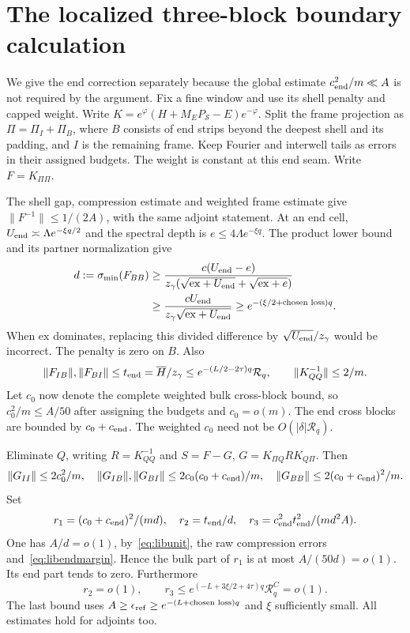 \section{The localized three-block boundary calculation}
\label{app:libboundary}

We give the end correction separately because the global estimate
$c_{\rm end}^2/m\ll A$ is not required by the argument.
Fix a fine window and use its shell penalty and capped weight.
Write $K=e^\varphi(H+M_EP_{\mathcal S}-E)e^{-\varphi}$.
Split the frame projection as $\Pi=\Pi_I+\Pi_B$, where $B$ consists
of end strips beyond the deepest shell and its padding, and
$I$ is the remaining frame. Keep Fourier and interwell tails as
errors in their assigned budgets. The weight is constant at this
end seam. Write $F=K_{\Pi\Pi}$.

The shell gap, compression estimate and weighted frame estimate give
$\|F^{-1}\|\le1/(2A)$, with the same adjoint statement.
At an end cell, $U_{\rm end}\asymp\Lambda e^{-\xi q/2}$ and the
spectral depth is $e\le4\Lambda e^{-\xi q}$.
The product lower bound and its partner normalization give
\begin{equation}\label{eq:libendmargin}
 \begin{split}
 d:=\sigma_{\min}(F_{BB})
 &\ge\frac{c(U_{\rm end}-e)}
 {z_\gamma(\sqrt{\mathrm{ex}+U_{\rm end}}
                         +\sqrt{\mathrm{ex}+e})}\\
 &\ge\frac{cU_{\rm end}}{z_\gamma\sqrt{\mathrm{ex}+U_{\rm end}}}
 \ge e^{-(\xi/2+\text{chosen loss})q}.
 \end{split}
\end{equation}
When $\mathrm{ex}$ dominates, replacing this divided difference by
$\sqrt{U_{\rm end}}/z_\gamma$ would be incorrect.
The penalty is zero on $B$.
Also
\[
 \|F_{IB}\|,\|F_{BI}\|\le t_{\rm end}
       =\overline H/z_\gamma\le e^{-(L/2-2\tau)q}\mathcal R_q,
 \qquad \|K_{QQ}^{-1}\|\le2/m.
\]
Let $c_0$ now denote the complete weighted bulk cross-block bound,
so $c_0^2/m\le A/50$ after assigning the budgets and
$c_0=o(m)$. The end cross blocks are bounded by $c_0+c_{\rm end}$.
The weighted $c_0$ need not be $O(|\delta|\mathcal R_q)$.

Eliminate $Q$, writing $R=K_{QQ}^{-1}$ and
$S=F-G$, $G=K_{\Pi Q}RK_{Q\Pi}$.
Then
\[
 \|G_{II}\|\le2c_0^2/m,\quad
 \|G_{IB}\|,\|G_{BI}\|\le2c_0(c_0+c_{\rm end})/m,\quad
 \|G_{BB}\|\le2(c_0+c_{\rm end})^2/m.
\]
Set
\[
 r_1=(c_0+c_{\rm end})^2/(md),\quad
 r_2=t_{\rm end}/d,\quad
 r_3=c_{\rm end}^2t_{\rm end}^2/(md^2A).
\]
One has $A/d=o(1)$, by~\eqref{eq:libunit}, the raw compression
errors and~\eqref{eq:libendmargin}. Hence the bulk part of $r_1$ is
at most $A/(50d)=o(1)$. Its end part tends to zero.
Furthermore
\begin{equation}\label{eq:librthree}
 r_2=o(1),\qquad
 r_3\le e^{(-L+3\xi/2+4\tau)q}\mathcal R_q^C=o(1).
\end{equation}
The last bound uses $A\ge\epsilon_{\rm ref}
\ge e^{-(L+\text{chosen loss})q}$ and $\xi$ sufficiently small.
All estimates hold for adjoints too.

